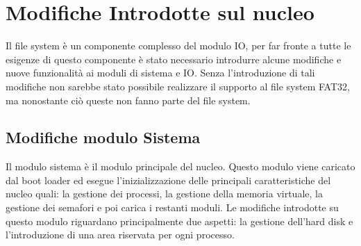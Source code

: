 \chapter{ Modifiche Introdotte sul nucleo}
\label{cap:Modifiche}
Il file system è un componente complesso del modulo IO, per far fronte a tutte le esigenze di questo componente è stato necessario introdurre alcune modifiche e nuove funzionalità ai moduli di sistema e IO.
Senza l'introduzione di tali modifiche non sarebbe stato possibile realizzare il supporto al file system FAT32, ma nonostante ciò queste non fanno parte del file system.\\	

 \section{Modifiche modulo Sistema}
 Il modulo sistema è il modulo principale del nucleo. Questo modulo viene caricato dal boot loader ed esegue l'inizializzazione delle principali caratteristiche del nucleo quali: la gestione dei processi, la gestione della memoria virtuale, la gestione dei semafori e poi carica i restanti moduli. 
 Le modifiche introdotte su questo modulo riguardano principalmente due aspetti: la gestione dell'hard disk e l'introduzione di una area riservata per ogni processo. 
